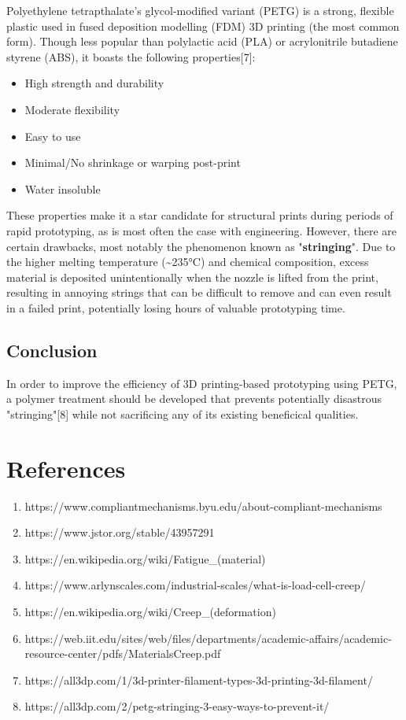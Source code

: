 \documentclass{report}
\begin{document}
Polyethylene tetrapthalate's glycol-modified variant (PETG) is a strong, flexible plastic used in fused deposition modelling (FDM) 3D printing (the most common form). 
Though less popular than polylactic acid (PLA) or acrylonitrile butadiene styrene (ABS), it boasts the following properties[7]:

\begin{itemize}
    \item High strength and durability
    \item Moderate flexibility
    \item Easy to use
    \item Minimal/No shrinkage or warping post-print
    \item Water insoluble
\end{itemize}
These properties make it a star candidate for structural prints during periods of rapid prototyping, as is most often the case with engineering.
However, there are certain drawbacks, most notably the phenomenon known as "\textbf{stringing}". Due to the higher melting temperature (\textasciitilde235°C) and chemical composition,
excess material is deposited unintentionally when the nozzle is lifted from the print, resulting in annoying strings that can be difficult to remove and can even result in a failed print, potentially losing hours of valuable prototyping time.

\subsection{Conclusion}

In order to improve the efficiency of 3D printing-based prototyping using PETG, a polymer treatment should be developed that prevents potentially disastrous
"stringing"[8] while not sacrificing any of its existing beneficical qualities. 

\pagebreak
\section{References}

\begin{enumerate}
    \item https://www.compliantmechanisms.byu.edu/about-compliant-mechanisms
    \item https://www.jstor.org/stable/43957291
    \item https://en.wikipedia.org/wiki/Fatigue\_(material)
    \item https://www.arlynscales.com/industrial-scales/what-is-load-cell-creep/
    \item https://en.wikipedia.org/wiki/Creep\_(deformation)
    \item https://web.iit.edu/sites/web/files/departments/academic-affairs/academic-resource-center/pdfs/MaterialsCreep.pdf
    \item https://all3dp.com/1/3d-printer-filament-types-3d-printing-3d-filament/
    \item https://all3dp.com/2/petg-stringing-3-easy-ways-to-prevent-it/
\end{enumerate}
\end{document}
